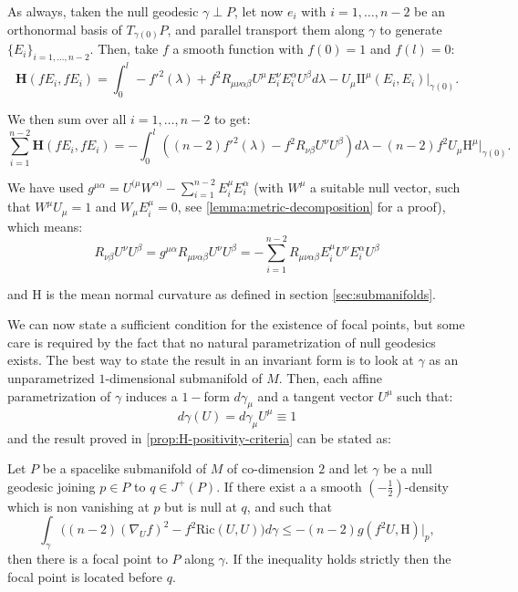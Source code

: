As always, taken the null geodesic \(\gamma\perp P\), let now \(e_i\) with \(i = 1, \ldots, n - 2\) be an orthonormal basis of \(T_{\gamma(0)}P\), and parallel transport them along \(\gamma\) to generate \(\{E_i\}_{i = 1, \ldots, n-2}\). Then, take \(f\) a smooth function with \(f(0) = 1\) and \(f(l) = 0\):
\begin{equation*}
	\textbf{H}(fE_i, fE_i) = \int_{0}^{l} -f'^2(\lambda) + f^2R_{\mu\nu\alpha\beta}U^{\mu}E_i^{\nu}E_i^{\alpha}U^{\beta} d\lambda- U_{\mu}\mathrm{I\!I}^{\mu}(E_i, E_i)\Big\vert_{\gamma(0)}.
\end{equation*}

We then sum over all \(i = 1, \ldots, n - 2\) to get:
\begin{equation}
	\label{eq:hessian-averagded}
	\sum_{i=1}^{n - 2}\textbf{H}(fE_i, fE_i) = - \int_{0}^{l} \left((n - 2)f'^2(\lambda) - f^2R_{\nu\beta}U^{\nu}U^{\beta}\right) d\lambda - (n - 2)f^2U_{\mu}\mathrm{H}^{\mu}\Big\vert_{\gamma(0)}.
\end{equation}

We have used \(g^{\mu\alpha} = U^{(\mu}W^{\alpha)} - \sum_{i=1}^{n - 2}E_i^{\mu}E_i^{\alpha}\) (with \(W^{\mu}\) a suitable null vector, such that \(W^{\mu}U_{\mu} = 1\) and \(W_{\mu}E_i^{\mu} = 0\), see \ref{lemma:metric-decomposition} for a proof), which means:
	\[
	R_{\nu\beta}U^{\nu}U^{\beta} = g^{\mu\alpha}R_{\mu\nu\alpha\beta}U^{\nu}U^{\beta} = - \sum_{i=1}^{n - 2}R_{\mu\nu\alpha\beta}E_i^{\mu}U^{\nu}E_i^{\alpha}U^{\beta}
	\]
	
	and \(\mathrm{H}\) is the mean normal curvature as defined in section \ref{sec:submanifolds}.

	We can now state a sufficient condition for the existence of focal points, but some care is required by the fact that no natural parametrization of null geodesics exists.
	The best way to state the result in an invariant form is to look at \(\gamma\) as an unparametrized \(1\)-dimensional submanifold of \(M\).
	Then, each affine parametrization of \(\gamma\) induces a \(1-\)form \(d\gamma_{\mu}\) and a tangent vector \(U^{\mu}\) such that:
	\[
	d\gamma(U) = d\gamma_{\mu}U^{\mu} \equiv 1
	\]
	and the result proved in \ref{prop:H-positivity-criteria} can be stated as:
	\begin{prop}
		\label{prop:fp-criteria}
		Let \(P\) be a spacelike submanifold of \(M\) of co-dimension \(2\) and let \(\gamma\) be a null geodesic joining \(p \in P\) to \(q\in J^+(P)\). If there exist a a smooth \((-\frac{1}{2})\)-density which is non vanishing at \(p\) but is null at \(q\), and such that
		\begin{equation}
		\label{eq:fp-criteria}
		\int_{\gamma} \big((n -2)(\nabla_Uf)^2 - f^2\text{Ric}(U, U) \big)d\gamma\le -(n -2) g(f^2 U, \mathrm{H})\Big\vert_{p},
		\end{equation}
		then there is a focal point to \(P\) along \(\gamma\). If the inequality holds strictly then the focal point is located before \(q\).
	\end{prop}

